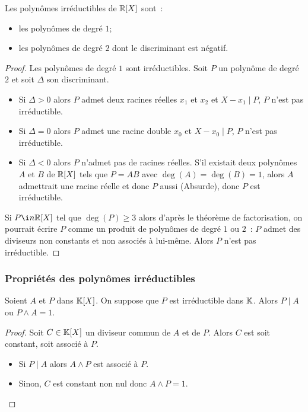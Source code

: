 \begin{prop}
  Les polynômes irréductibles de \(\mathbb{R}[X]\) sont~:
  \begin{itemize}
    \item les polynômes de degré \(1\);
    \item les polynômes de degré \(2\) dont le discriminant est négatif.
  \end{itemize}
\end{prop}
\begin{proof}
  Les polynômes de degré \(1\) sont irréductibles. Soit \(P\) un polynôme de
  degré \(2\) et soit \(\Delta\) son discriminant.
  \begin{itemize}
    \item Si \(\Delta>0\) alors \(P\) admet deux racines réelles \(x_1\) et
      \(x_2\) et \(X-x_1\mid{}P\), \(P\) n'est pas irréductible.
    \item Si \(\Delta = 0\) alors \(P\) admet une racine double \(x_0\) et
      \(X-x_0\mid{}P\), \(P\) n'est pas irréductible.
    \item Si \(\Delta <0\) alors \(P\) n'admet pas de racines réelles. S'il
      existait deux polynômes \(A\) et \(B\) de \(\mathbb{R}[X]\) tels que \(P = AB\) avec
      \(\deg(A) = \deg(B) = 1\), alors \(A\) admettrait une racine réelle et donc
      \(P\) aussi (Absurde), donc \(P\) est irréductible.
  \end{itemize}
  Si \(P \i n \R[X]\) tel que \(\deg(P)\geqslant 3\) alors d'après le théorème de
  factorisation, on pourrait écrire \(P\) comme un produit de polynômes de degré
  \(1\) ou \(2\)~: \(P\) admet des diviseurs non constants et non associés à
  lui-même. Alors \(P\) n'est pas irréductible.
\end{proof}

\subsubsection{Propriétés des polynômes irréductibles}

\begin{prop}
  Soient \(A\) et \(P\) dans \(\mathbb{K}[X]\). On suppose que \(P\) est irréductible
  dans \(\mathbb{K}\). Alors \(P\mid{}A\) ou \(P \wedge A = 1\).
\end{prop}
\begin{proof}
  Soit \(C \in \mathbb{K}[X]\) un diviseur commun de \(A\) et de \(P\). Alors \(C\) est
  soit constant, soit associé à \(P\).
  \begin{itemize}
    \item Si \(P\mid{}A\) alors \(A\wedge P\) est associé à \(P\).
    \item Sinon, \(C\) est constant non nul donc \(A \wedge P = 1\).
  \end{itemize}
\end{proof}

